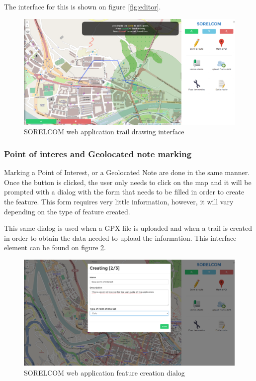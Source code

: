 The interface for this is shown on figure \ref{fig:editor}.

\begin{figure}[ht]
  \centering
  \includegraphics[width=.75\textwidth]{fig/draw-trail}
  \caption{SORELCOM web application trail drawing interface}
  \label{fig:trail-draw}
\end{figure}


\subsubsection*{Point of interes and Geolocated note marking}

Marking a Point of Interest, or a Geolocated Note are done in the same manner. Once the button is clicked, the user only needs to click on the map and it will be prompted with a dialog with the form that needs to be filled in order to create the feature. This form requires very little information, however, it will vary depending on the type of feature created.

This same dialog is used when a GPX file is uploaded and when a trail is created in order to obtain the data needed to upload the information. This interface element can be found on figure \ref{fig:create}.

\begin{figure}[ht]
  \centering
  \includegraphics[width=.75\textwidth]{fig/mark-poi}
  \caption{SORELCOM web application feature creation dialog}
  \label{fig:create}
\end{figure}

